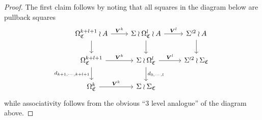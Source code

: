 \documentclass[a4paper,10pt
]{article}%
\numberwithin{equation}{section}
\numberwithin{figure}{section}
\theoremstyle{definition} %
\newcommand{\1}{\ensuremath{\mathbbm 1}}%
\begin{document}
\begin{proof}
	The first claim follows by noting that all squares in the diagram below are pullback squares
	\[
	\begin{tikzcd}
	\Omega^{k+l+1}_{\mathfrak{C}} \wr A \ar{r}{\boldsymbol{V}^k} \ar{d} &
	\Sigma \wr \Omega^{l}_{\mathfrak{C}} \wr A  \ar{d} \ar{r}{\boldsymbol{V}^l} &
	\Sigma^{\wr 2} \wr A \ar{d}
	\\
	\Omega^{k+l+1}_{\mathfrak{C}} \ar{r}{\boldsymbol{V}^k} 
	\ar{d}[swap]{d_{k+1,\cdots,k+l+1}} &
	\Sigma \wr \Omega^{l}_{\mathfrak{C}} \ar{r}{\boldsymbol{V}^l}
	\ar{d}{d_{0,\cdots,l}} &
	\Sigma^{\wr 2} \wr \Sigma_{\mathfrak{C}}
	\\
	\Omega^{k}_{\mathfrak{C}} \ar{r}{\boldsymbol{V}^k} &
	\Sigma \wr \Sigma_{\mathfrak{C}}
	\end{tikzcd}
	\]
	while associativity follows from the obvious 
	``3 level analogue'' of the diagram above.
	

\end{proof}
\end{document}
